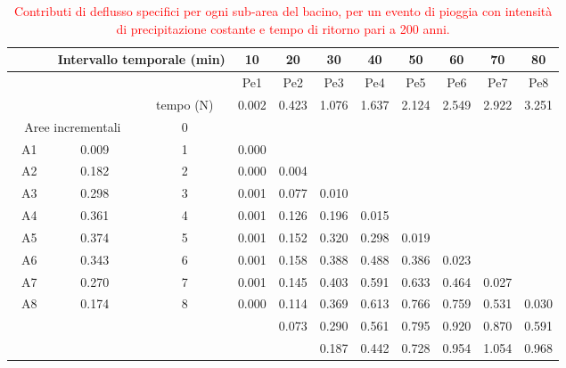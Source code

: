 \begin{table}[H] \centering
    \caption{\textcolor{red}{Contributi di deflusso specifici per ogni sub-area del bacino, per un evento di pioggia con intensità di precipitazione costante e tempo di ritorno pari a 200 anni.}}
    \begin{tabular}{ccccccccccc}
    \toprule
 & \multicolumn{2}{c}{Intervallo temporale (min)}  & 10& 20    & 30    & 40    & 50    & 60    & 70    & 80    \\ 
 \midrule
 & & & Pe1   & Pe2   & Pe3   & Pe4   & Pe5   & Pe6   & Pe7   & Pe8   \\
&& tempo (N)& 0.002 & 0.423 & 1.076 & 1.637 & 2.124 & 2.549 & 2.922 & 3.251 \\
    \multicolumn{2}{c}{Aree incrementali} & 0                     &       &       &       &       &       &       &       &       \\
    A1          & 0.009                   & 1                     & 0.000 &       &       &       &       &       &       &       \\
    A2          & 0.182                   & 2                     & 0.000 & 0.004 &       &       &       &       &       &       \\
    A3          & 0.298                   & 3                     & 0.001 & 0.077 & 0.010 &       &       &       &       &       \\
    A4          & 0.361                   & 4                     & 0.001 & 0.126 & 0.196 & 0.015 &       &       &       &       \\
    A5          & 0.374                   & 5                     & 0.001 & 0.152 & 0.320 & 0.298 & 0.019 &       &       &       \\
    A6          & 0.343                   & 6                     & 0.001 & 0.158 & 0.388 & 0.488 & 0.386 & 0.023 &       &       \\
    A7          & 0.270                   & 7                     & 0.001 & 0.145 & 0.403 & 0.591 & 0.633 & 0.464 & 0.027 &       \\
    A8          & 0.174                   & 8                     & 0.000 & 0.114 & 0.369 & 0.613 & 0.766 & 0.759 & 0.531 & 0.030 \\
    \textbf{}   &                         &                       &       & 0.073 & 0.290 & 0.561 & 0.795 & 0.920 & 0.870 & 0.591 \\
    \textbf{}   &                         &                       &       &       & 0.187 & 0.442 & 0.728 & 0.954 & 1.054 & 0.968 \\

\end{tabular}
\end{table}
